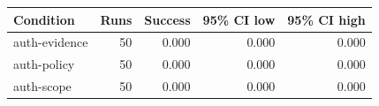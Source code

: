 \begin{tabular}{lrrrr}
\toprule
Condition & Runs & Success & 95\% CI low & 95\% CI high \\
\midrule
auth-evidence & 50 & 0.000 & 0.000 & 0.000 \\
auth-policy & 50 & 0.000 & 0.000 & 0.000 \\
auth-scope & 50 & 0.000 & 0.000 & 0.000 \\
\bottomrule
\end{tabular}
